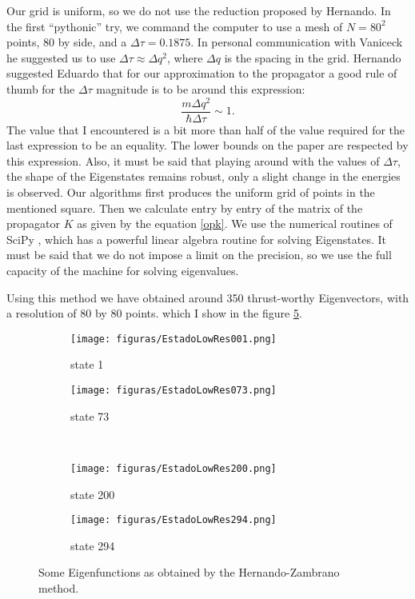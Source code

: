 \documentclass[a4paper,12pt]{article}
\newcommand{\dt}{\Delta\tau}
\begin{document}
Our grid is uniform, so we do not use the reduction proposed by Hernando.
In the first ``pythonic'' try, we command the computer to use a mesh of 
$N=80^2$ points, $80$ by side, and a $ \dt=0.1875$. In personal communication
with Vaniceck he suggested us to use $\dt \approx \Delta q ^2$, where
$\Delta q$ is the spacing in the grid. Hernando suggested Eduardo that
for our approximation to the propagator a good rule of thumb for 
the $\dt$ magnitude is to be around this expression:
\begin{equation}
\frac{m \Delta q^2}{\hbar \dt}\sim 1.
\end{equation}
The value that I encountered is a bit more than 
 half of the value
required for the last expression to be an equality.
The lower bounds on the paper are respected by this expression.
Also, it must be said that playing around with the values of
$\dt$, the shape of the Eigenstates remains robust, only a
slight change in the energies is observed. 
Our algorithms first produces the uniform grid of points in
the mentioned square. Then we calculate entry by entry of the
matrix of the propagator $K$ as given by the equation 
\ref{opk}. We use the numerical routines of SciPy \cite{scipy},
which has a powerful linear algebra routine for solving Eigenstates.
It must be said that we do not impose a limit on the precision, so
we use the full capacity of the machine for solving eigenvalues.

Using this method we have obtained around 350 thrust-worthy Eigenvectors, 
with a resolution of 80 by 80 points. which I show in the figure
\ref{muestrasprimerintento}.

\begin{figure}[h]
  \centering
  \begin{subfigure}[b]{0.48\textwidth}
    \texttt{[image: figuras/EstadoLowRes001.png]}
    \caption{state 1}
    \label{fig:gull}
  \end{subfigure}%
  \begin{subfigure}[b]{0.48\textwidth}
    \texttt{[image: figuras/EstadoLowRes073.png]}
    \caption{state 73}
    \label{fig:tiger}
  \end{subfigure}\\
  \begin{subfigure}[b]{0.48\textwidth}
    \texttt{[image: figuras/EstadoLowRes200.png]}
    \caption{state 200}
    \label{fig:mouse}
  \end{subfigure}
  \begin{subfigure}[b]{0.48\textwidth}
    \texttt{[image: figuras/EstadoLowRes294.png]}
    \caption{state 294}
    \label{fig:mouse}
  \end{subfigure}
  \caption{Some Eigenfunctions as obtained by the Hernando-Zambrano method.} 
  \label{muestrasprimerintento}
\end{figure}
\end{document}
